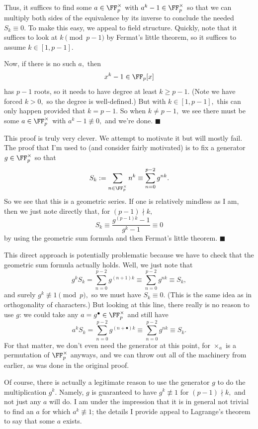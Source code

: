 Thus, it suffices to find some $a\in\FF_p^\times$ with $a^k-1\in\FF_p^\times$ so that we can multiply both sides of the equivalence by its inverse to conclude the needed $S_k\equiv0.$ To make this easy, we appeal to field structure. Quickly, note that it suffices to look at $k\pmod{p-1}$ by Fermat's little theorem, so it suffices to assume $k\in[1,p-1].$

Now, if there is no such $a,$ then
\[x^k-1\in\FF_p[x]\]
has $p-1$ roots, so it needs to have degree at least $k\ge p-1.$ (Note we have forced $k>0,$ so the degree is well-defined.) But with $k\in[1,p-1],$ this can only happen provided that $k=p-1.$ So when $k\ne p-1,$ we see there must be some $a\in\FF_p^\times$ with $a^k-1\not\equiv0,$ and we're done. $\blacksquare$

This proof is truly very clever. We attempt to motivate it but will mostly fail. The proof that I'm used to (and consider fairly motivated) is to fix a generator $g\in\FF_p^\times$ so that
\[S_k:=\sum_{n\in\FF_p^\times}n^k\equiv\sum_{n=0}^{p-2}g^{nk}.\]
So we see that this is a geometric series. If one is relatively mindless as I am, then we just note directly that, for $(p-1)\nmid k,$
\[S_k\equiv\frac{g^{(p-1)k}-1}{g^k-1}\equiv0\]
by using the geometric sum formula and then Fermat's little theorem. $\blacksquare$

This direct approach is potentially problematic because we have to check that the geometric sum formula actually holds. Well, we just note that
\[g^kS_k=\sum_{n=0}^{p-2}g^{(n+1)k}\equiv\sum_{n=0}^{p-2}g^{nk}\equiv S_k,\]
and surely $g^k\not\equiv1\pmod p,$ so we must have $S_k\equiv0.$ (This is the same idea as in orthogonality of characters.) But looking at this line, there really is no reason to use $g$:  we could take any $a=g^\bullet\in\FF_p^\times$ and still have
\[a^kS_k=\sum_{n=0}^{p-2}g^{(n+\bullet)k}\equiv\sum_{n=0}^{p-2}g^{nk}\equiv S_k.\]
For that matter, we don't even need the generator at this point, for $\times_a$ is a permutation of $\FF_p^\times$ anyways, and we can throw out all of the machinery from earlier, as was done in the original proof.

Of course, there is actually a legitimate reason to use the generator $g$ to do the multiplication $g^k.$ Namely, $g$ is guaranteed to have $g^k\not\equiv1$ for $(p-1)\nmid k,$ and not just any $a$ will do. I am under the impression that it is in general not trivial to find an $a$ for which $a^k\not\equiv1$; the details I provide appeal to Lagrange's theorem to say that some $a$ exists.

